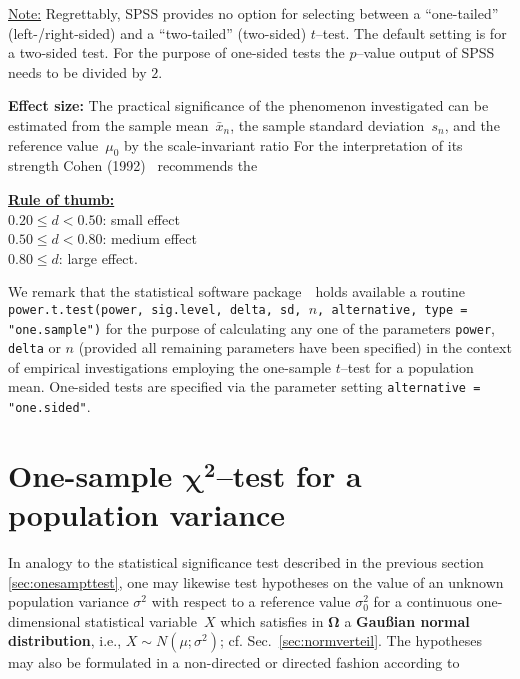 \medskip
\noindent
\underline{Note:} Regrettably, SPSS provides no option for 
selecting between a ``one-tailed'' (left-/right-sided) and a 
``two-tailed'' (two-sided) $t$--test. The default setting is for a 
two-sided test. For the purpose of one-sided tests the $p$--value 
output of SPSS needs to be divided by $2$.

\medskip
\noindent
\textbf{Effect size:} The practical significance of the phenomenon investigated can be estimated from the sample mean~$\bar{x}_{n}$,
the sample standard deviation~$s_{n}$, and the reference
value~$\mu_{0}$ by the scale-invariant ratio
%
\be
{}
\ee
%
For the interpretation of its strength Cohen 
(1992)~ recommends the

\medskip
\noindent
\underline{\textbf{Rule of thumb:}}\\
$0.20 \leq d < 0.50$: small effect\\
$0.50 \leq d < 0.80$: medium effect\\
$0.80 \leq d$: large effect.

\medskip
\noindent
We remark that the statistical software package~\R\ holds 
available a routine \texttt{power.t.test(power, sig.level, delta,
sd, $n$, alternative, type = "one.sample")} for the purpose of
calculating any one of the parameters \texttt{power},
\texttt{delta} or $n$ (provided all remaining parameters have been
specified) in the context of empirical investigations employing the
one-sample $t$--test for a population mean. One-sided tests are
specified via the parameter setting
\texttt{alternative = "one.sided"}.

\section[One-sample $\chi^{2}$--test for a population 
variance]{One-sample $\boldsymbol{\chi^{2}}$--test for a population
variance}
In analogy to the statistical significance test described in the 
previous section \ref{sec:onesampttest}, one may likewise test 
hypotheses on the value of an unknown population variance 
$\sigma^{2}$ with respect to a reference value $\sigma_{0}^{2}$ 
for a continuous one-dimensional statistical variable~$X$ which 
satisfies in $\boldsymbol{\Omega}$ a \textbf{Gau\ss ian normal 
distribution}, i.e., $X \sim N(\mu;\sigma^{2})$; cf. 
Sec.~\ref{sec:normverteil}. The hypotheses may also be formulated 
in a non-directed or directed fashion according to

